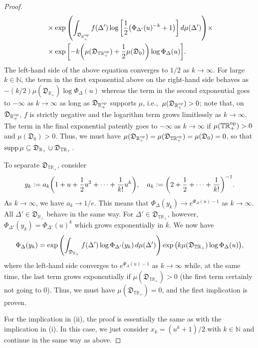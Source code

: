 \documentclass[12pt,a4paper,reqno]{amsart}
\theoremstyle{definition}
\newcommand{\mf}[1]{\mathfrak{#1}}
\newcommand{\N}{\mathbb N}
\newcommand{\R}{\mathbb R}
\newcommand{\T}{\mathbb T}
\let\originalleft\left
\let\originalright\right
\renewcommand{\left}{\mathopen{}\mathclose\bgroup\originalleft}
\renewcommand{\right}{\aftergroup\egroup\originalright}
\begin{document}
\begin{proof}
\begin{align*}
&\times \exp{\left(\int_{\mf D_{\R_+^{\rm op}}}f(\Delta')\log{\left[\frac{1}{2}\big(\Phi_{\Delta'}(u)^{-k}+1\big)\right]}\,d\mu(\Delta')\right)}\times\\
&\times\exp{\left[-k\left(\mu(\mf D_{\T\R_+^{\rm op}})+\frac{1}{2}\mu(\mf D_0)\right)\log{\Phi_\Delta(u)}\right]}.
\end{align*}
The left-hand side of the above equation converges to $1/2$ as $k\to\infty$. For large $k\in\N$, the term in the first exponential above on the right-hand side behaves as $-(k/2)\mu(\mf D_{\R_+})\log{\Phi_\Delta(u)}$ whereas the term in the second exponential goes to $-\infty$ as $k\to\infty$ as long as $\mf D_{\R_+^{\rm op}}$ supports $\mu$, i.e.,\ $\mu(\mf D_{\R_+^{\rm op}})>0$; note that, on $\mf D_{\R_+^{\rm op}}$, $f$ is strictly negative and the logarithm term grows limitlessly as $k\to\infty$. The term in the final exponential patently goes to $-\infty$ as $k\to\infty$ if $\mu(\T\R_+^{\rm op})>0$ and $\mu(\mf D_0)>0$. Thus, we must have $\mu(\mf D_{\R_+^{\rm op}})=\mu(\mf D_{\T\R_+^{\rm op}})=\mu(\mf D_0)=0$, so that ${\rm supp}\,\mu\subseteq\mf D_{\R_+}\cup\mf D_{\T\R_+}$.

To separate $\mf D_{\T\R_+}$, consider
$$
y_k:=a_k\left(1+u+\frac{1}{2}u^2+\cdots+\frac{1}{k!}u^k\right),\quad a_k:=\left(2+\frac{1}{2}+\cdots+\frac{1}{k!}\right)^{-1}.
$$
As $k\to\infty$, we have $a_k\to 1/e$. This means that $\Phi_\Delta(y_k)\to e^{\Phi_\Delta(u)-1}$ as $k\to\infty$. All $\Delta'\in\mf D_{\R_+}$ behave in the same way. For $\Delta'\in\mf D_{\T\R_+}$, however, $\Phi_{\Delta'}(y_k)=\Phi_{\Delta'}(u)^k$ which grows exponentially in $k$. We now have
$$
\Phi_\Delta(y_k)=\exp{\left(\int_{\mf D_{\R_+}}f(\Delta')\log{\Phi_{\Delta'}(y_k)}\,d\mu(\Delta')\right)}\exp{\big(k\mu(\mf D_{\T\R_+})\log{\Phi_\Delta(u)}\big)},
$$
where the left-hand side converges to $e^{\Phi_\Delta(u)-1}$ as $k\to\infty$ while, at the same time, the last term grows exponentially if $\mu(\mf D_{\T\R_+})>0$ (the first term certainly not going to 0). Thus, we must have $\mu(\mf D_{\T\R_+})=0$, and the first implication is proven.

For the implication in (ii), the proof is essentially the same as with the implication in (i). In this case, we just consider $x_k=(u^k+1)/2$ with $k\in\N$ and continue in the same way as above.


\end{proof}
\end{document}
